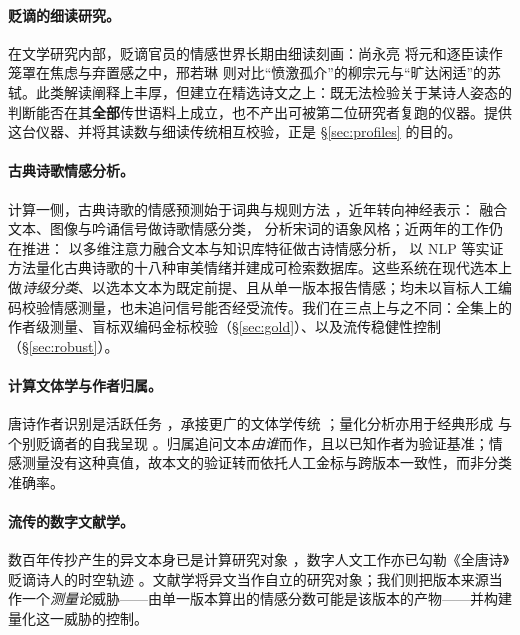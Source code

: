 \documentclass[11pt]{article}
\begin{document}
\paragraph{贬谪的细读研究。}在文学研究内部，贬谪官员的情感世界长期由细读刻画：尚永亮 \citep{shang2007exiled} 将元和逐臣读作笼罩在焦虑与弃置感之中，邢若琳 \citep{xing2024liusu} 则对比“愤激孤介”的柳宗元与“旷达闲适”的苏轼。此类解读阐释上丰厚，但建立在精选诗文之上：既无法检验关于某诗人姿态的判断能否在其\textbf{全部}传世语料上成立，也不产出可被第二位研究者复跑的仪器。提供这台仪器、并将其读数与细读传统相互校验，正是 §\ref{sec:profiles} 的目的。

\paragraph{古典诗歌情感分析。}计算一侧，古典诗歌的情感预测始于词典与规则方法 \citep{hou2015sentiment}，近年转向神经表示：\citet{du2025multimodal} 融合文本、图像与吟诵信号做诗歌情感分类，\citet{fang2011cld} 分析宋词的语象风格；近两年的工作仍在推进：\citet{liu2025samcap} 以多维注意力融合文本与知识库特征做古诗情感分析，\citet{qin2025shades} 以 NLP 等实证方法量化古典诗歌的十八种审美情绪并建成可检索数据库。这些系统在现代选本上做\emph{诗级分类}、以选本文本为既定前提、且从单一版本报告情感；均未以盲标人工编码校验情感测量，也未追问信号能否经受流传。我们在三点上与之不同：全集上的作者级测量、盲标双编码金标校验（\S\ref{sec:gold}）、以及流传稳健性控制（\S\ref{sec:robust}）。

\paragraph{计算文体学与作者归属。}唐诗作者识别是活跃任务 \citep{shiziren2022,zhou2021lda}，承接更广的文体学传统 \citep{stamatatos2009survey}；量化分析亦用于经典形成 \citep{wang2008finding} 与个别贬谪者的自我呈现 \citep{wang2023lideyu}。归属追问文本\emph{由谁}而作，且以已知作者为验证基准；情感测量没有这种真值，故本文的验证转而依托人工金标与跨版本一致性，而非分类准确率。

\paragraph{流传的数字文献学。}数百年传抄产生的异文本身已是计算研究对象 \citep{yuan2023variants}，数字人文工作亦已勾勒《全唐诗》贬谪诗人的时空轨迹 \citep{bianzhe2022}。文献学将异文当作自立的研究对象；我们则把版本来源当作一个\emph{测量论}威胁——由单一版本算出的情感分数可能是该版本的产物——并构建量化这一威胁的控制。
\end{document}
